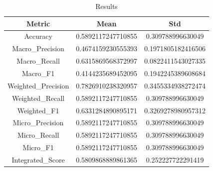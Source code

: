\begin{table}[htbp]
\centering
\caption{Results}
\label{tab:csv}
\small
\setlength{\tabcolsep}{4pt}
\begin{tabular}{|c|c|c|}
\hline
Metric & Mean & Std \\
\hline
Accuracy & 0.5892117247710855 & 0.309788996630049 \\
Macro_Precision & 0.4674159230555393 & 0.1971805182416506 \\
Macro_Recall & 0.6315869568372997 & 0.0822411543027335 \\
Macro_F1 & 0.4144235689452095 & 0.1942245389608684 \\
Weighted_Precision & 0.7826910238320957 & 0.3455334938272474 \\
Weighted_Recall & 0.5892117247710855 & 0.309788996630049 \\
Weighted_F1 & 0.6331284890895171 & 0.3269278980957312 \\
Micro_Precision & 0.5892117247710855 & 0.309788996630049 \\
Micro_Recall & 0.5892117247710855 & 0.309788996630049 \\
Micro_F1 & 0.5892117247710855 & 0.309788996630049 \\
Integrated_Score & 0.5809868889861365 & 0.252227722291419 \\
\hline
\end{tabular}
\end{table}